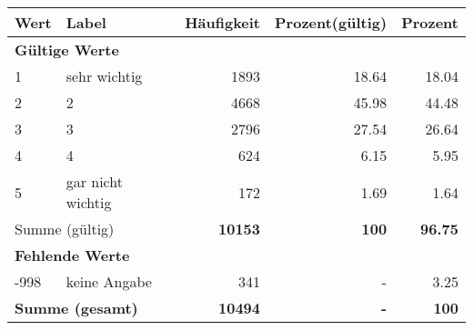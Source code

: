      \begin{longtable}{lXrrr}
     \toprule
     \textbf{Wert} & \textbf{Label} & \textbf{Häufigkeit} & \textbf{Prozent(gültig)} & \textbf{Prozent} \\
     \endhead
     \midrule
     \multicolumn{5}{l}{\textbf{Gültige Werte}}\\

     1 &
     \multicolumn{1}{X}{ sehr wichtig   } &


       \num{1893} &
       \num[round-mode=places,round-precision=2]{18.64} &
         \num[round-mode=places,round-precision=2]{18.04} \\

     2 &
     \multicolumn{1}{X}{ 2   } &


       \num{4668} &
       \num[round-mode=places,round-precision=2]{45.98} &
         \num[round-mode=places,round-precision=2]{44.48} \\

     3 &
     \multicolumn{1}{X}{ 3   } &


       \num{2796} &
       \num[round-mode=places,round-precision=2]{27.54} &
         \num[round-mode=places,round-precision=2]{26.64} \\

     4 &
     \multicolumn{1}{X}{ 4   } &


       \num{624} &
       \num[round-mode=places,round-precision=2]{6.15} &
         \num[round-mode=places,round-precision=2]{5.95} \\

     5 &
     \multicolumn{1}{X}{ gar nicht wichtig   } &


       \num{172} &
       \num[round-mode=places,round-precision=2]{1.69} &
         \num[round-mode=places,round-precision=2]{1.64} \\
     \midrule
     \multicolumn{2}{l}{Summe (gültig)} &
       \textbf{\num{10153}} &
     \textbf{\num{100}} &
       \textbf{\num[round-mode=places,round-precision=2]{96.75}} \\
     \multicolumn{5}{l}{\textbf{Fehlende Werte}}\\
       -998 &
       keine Angabe &
         \num{341} &
        - &
         \num[round-mode=places,round-precision=2]{3.25} \\
     \midrule
     \multicolumn{2}{l}{\textbf{Summe (gesamt)}} &
          \textbf{\num{10494}} &
        \textbf{-} &
        \textbf{\num{100}} \\
     \bottomrule
     \end{longtable}
     
